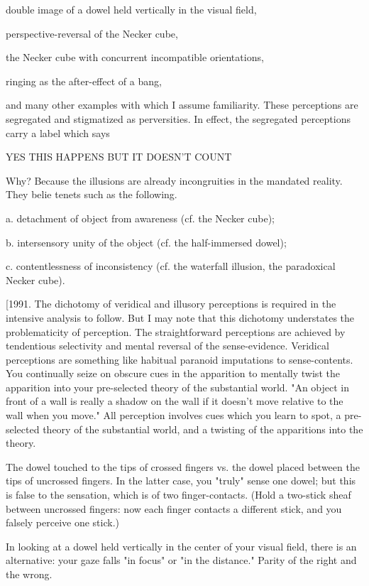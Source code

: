     double image of a dowel held vertically in the visual field,

    perspective-reversal of the Necker cube,

    the Necker cube with concurrent incompatible orientations,

    ringing as the after-effect of a bang,

and many other examples with which I assume familiarity. These perceptions are segregated and stigmatized as perversities. In effect, the segregated perceptions carry a label which says

    YES THIS HAPPENS BUT IT DOESN'T COUNT

Why? Because the illusions are already incongruities in the mandated reality. They belie tenets such as the following.

    a. detachment of object from awareness (cf. the Necker cube);

    b. intersensory unity of the object (cf. the half-immersed dowel);

    c. contentlessness of inconsistency (cf. the waterfall illusion, the paradoxical Necker cube).

[1991. The dichotomy of veridical and illusory perceptions is required in the intensive analysis to follow. But I may note that this dichotomy understates the problematicity of perception. The straightforward perceptions are achieved by tendentious selectivity and mental reversal of the sense-evidence. Veridical perceptions are something like habitual paranoid imputations to sense-contents. You continually seize on obscure cues in the apparition to mentally twist the apparition into your pre-selected theory of the substantial world. "An object in front of a wall is really a shadow on the wall if it doesn't move relative to the wall when you move." All perception involves cues which you learn to spot, a pre-selected theory of the substantial world, and a twisting of the apparitions into the theory.

The dowel touched to the tips of crossed fingers vs. the dowel placed between the tips of uncrossed fingers. In the latter case, you "truly" sense one dowel; but this is false to the sensation, which is of two finger-contacts. (Hold a two-stick sheaf between uncrossed fingers: now each finger contacts a different stick, and you falsely perceive one stick.)

In looking at a dowel held vertically in the center of your visual field, there is an alternative: your gaze falls "in focus" or "in the distance." Parity of the right and the wrong.


